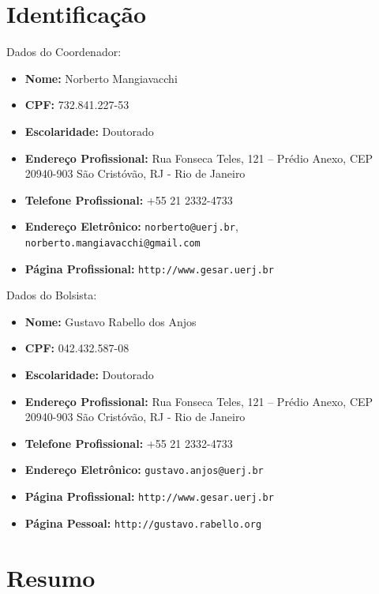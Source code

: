 \documentclass[a4paper,portuges,12pt]{article}
\begin{document}
	


\tableofcontents
\newpage

\section{Identificação}

\noindent Dados do Coordenador: 
\begin{itemize}
	\item \textbf{Nome:} Norberto Mangiavacchi
	\item \textbf{CPF:} 732.841.227-53
	\item \textbf{Escolaridade:} Doutorado
	\item \textbf{Endereço Profissional:} Rua Fonseca Teles, 121 --
	Prédio Anexo, CEP 20940-903 São Cristóvão, RJ - Rio de Janeiro
	\item \textbf{Telefone Profissional:} +55 21 2332-4733
	\item \textbf{Endereço Eletrônico:} {\tt norberto@uerj.br}, 
	                                    {\tt norberto.mangiavacchi@gmail.com}
	\item \textbf{Página Profissional:} {\tt http://www.gesar.uerj.br}
\end{itemize}

\hspace{1cm}

\noindent Dados do Bolsista: 
\begin{itemize}
	\item \textbf{Nome:} Gustavo Rabello dos Anjos
	\item \textbf{CPF:} 042.432.587-08
	\item \textbf{Escolaridade:} Doutorado
	\item \textbf{Endereço Profissional:} Rua Fonseca Teles, 121 --
	Prédio Anexo, CEP 20940-903 São Cristóvão, RJ - Rio de Janeiro
	\item \textbf{Telefone Profissional:} +55 21 2332-4733
	\item \textbf{Endereço Eletrônico:} {\tt gustavo.anjos@uerj.br}
	\item \textbf{Página Profissional:} {\tt http://www.gesar.uerj.br}
	\item \textbf{Página Pessoal:} {\tt http://gustavo.rabello.org}
\end{itemize}

\clearpage

\section{Resumo}
\end{document}
